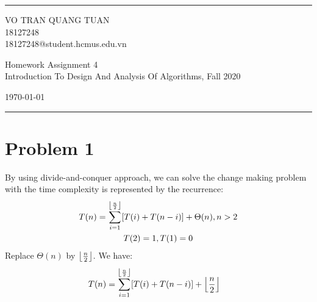 \documentclass[a4paper]{article}
\DeclarePairedDelimiter\floor{\lfloor}{\rfloor}
\begin{document}

\fancyhead[C]{}
\hrule \medskip %
\begin{minipage}{0.295\textwidth} 
\raggedright
\footnotesize
VO TRAN QUANG TUAN\hfill\\   
18127248\hfill\\
18127248@student.hcmus.edu.vn
\end{minipage}
\begin{minipage}{0.4\textwidth} 
\centering 
\large 
Homework Assignment 4\\ 
\normalsize 
Introduction To Design And Analysis Of Algorithms, Fall 2020\\ 
\end{minipage}
\begin{minipage}{0.295\textwidth} 
\raggedleft
\today\hfill\\
\end{minipage}
\medskip\hrule 
\bigskip

\tableofcontents
\newpage
\section{Problem 1}
By using divide-and-conquer approach, we can solve the change making problem with the time complexity is represented by the recurrence: 
\begin{gather*}
    T(n) = \sum_{i=1}^{\floor*{\frac{n}{2}}}[T(i) + T(n-i)] + \Theta(n), n >2 \\
    T(2)=1, T(1)=0
\end{gather*}
Replace $\Theta(n)$ by $\floor*{\frac{n}{2}}$. We have:
\begin{equation*}
    \begin{aligned}
        T(n) & = \sum_{i=1}^{\floor*{\frac{n}{2}}}[T(i) + T(n-i)] + \floor*{\frac{n}{2}} 
    \end{aligned}
\end{equation*}
\end{document}

